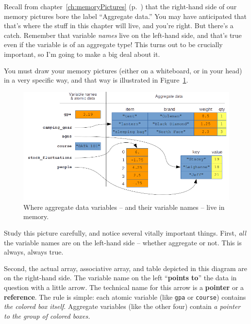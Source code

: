 Recall from chapter~\ref{ch:memoryPictures} (p.~\pageref{fig:memoryPicture})
that the right-hand side of our memory pictures bore the label
``\textsf{Aggregate data}.'' You may have anticipated that that's where the
stuff in this chapter will live, and you're right. But there's a catch.
Remember that variable \textit{names} live on the left-hand side, and that's
true even if the variable is of an aggregate type! This turns out to be
crucially important, so I'm going to make a big deal about it.

You must draw your memory pictures (either on a whiteboard, or in your head) in
a very specific way, and that way is illustrated in
Figure~\ref{fig:aggregateMemory}.

\begin{figure}[ht]
\centering
\includegraphics[width=1\textwidth]{aggregateMemory.png}
\caption{Where aggregate data variables -- and their variable names -- live in
memory.}
\label{fig:aggregateMemory}
\end{figure}

Study this picture carefully, and notice several vitally important things.
First, \textit{all} the variable names are on the left-hand side -- whether
aggregate or not. This is always, always true.


Second, the actual array, associative array, and table depicted in this diagram
are on the right-hand side. The variable name on the left ``\textbf{points
to}'' the data in question with a little arrow. The technical name for this
arrow is a \textbf{pointer} or a \textbf{reference}. The rule is simple: each
atomic variable (like \texttt{gpa} or \texttt{course}) contains \textit{the
colored box itself}. Aggregate variables (like the other four) contain
\textit{a pointer to the group of colored boxes.}

